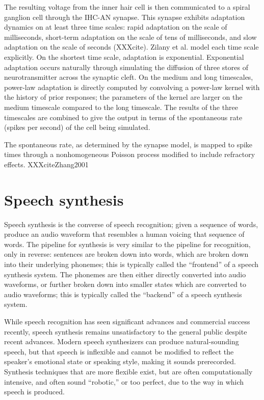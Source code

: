 \documentclass{article}
\begin{document}
The resulting voltage from the inner hair cell
is then communicated to a spiral ganglion cell
through the IHC-AN synapse.
This synapse exhibits adaptation dynamics
on at least three time scales:
rapid adaptation on the scale of milliseconds,
short-term adaptation on the scale of tens of milliseconds,
and slow adaptation on the scale of seconds
(XXXcite).
Zilany et al. model each time scale explicitly.
On the shortest time scale,
adaptation is exponential.
Exponential adaptation occurs naturally
through simulating the diffusion
of three stores of neurotransmitter
across the synaptic cleft.
On the medium and long timescales,
power-law adaptation is directly computed
by convolving a power-law kernel with
the history of prior responses;
the parameters of the kernel
are larger on the medium timescale
compared to the long timescale.
The results of the three timescales
are combined to give the output
in terms of the spontaneous rate
(spikes per second) of the cell being simulated.

The spontaneous rate,
as determined by the synapse model,
is mapped to spike times
through a nonhomogeneous Poisson process
modified to include refractory effects.
XXXciteZhang2001

\section{Speech synthesis}

Speech synthesis is the converse
of speech recognition;
given a sequence of words,
produce an audio waveform
that resembles a human
voicing that sequence of words.
The pipeline for synthesis is very similar
to the pipeline for recognition,
only in reverse:
sentences are broken down into words,
which are broken down into
their underlying phonemes;
this is typically called the
``frontend'' of a speech synthesis system.
The phonemes are then either
directly converted into audio waveforms,
or further broken down into
smaller states which are converted to audio waveforms;
this is typically called the ``backend''
of a speech synthesis system.

While speech recognition
has seen significant advances
and commercial success recently,
speech synthesis remains
unsatisfactory to the general public
despite recent advances.
Modern speech synthesizers can
produce natural-sounding speech,
but that speech is inflexible
and cannot be modified
to reflect the speaker's
emotional state or speaking style,
making it sounds prerecorded.
Synthesis techniques
that are more flexible exist,
but are often computationally intensive,
and often sound ``robotic,''
or too perfect,
due to the way in which
speech is produced.
\end{document}
